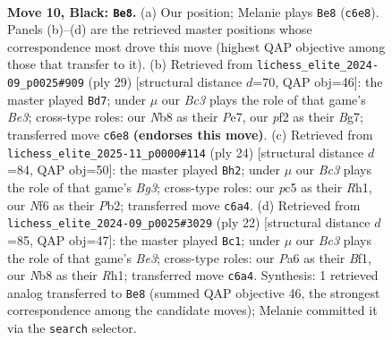 \documentclass[11pt]{article}
\begin{document}
\begin{figure}[p]\centering
\begin{subfigure}{0.46\textwidth}\centering
\resizebox{\linewidth}{!}{%
\newchessgame
\chessboard[
  setfen={rn1k1b1r/1p3ppp/p1b1pn2/2P1N3/P1B5/4P3/1P3PPP/RNB2RK1 b - - 1 10},
  showmover=false,
  pgfstyle=straightmove, color=movearrow, markmove={c6-e8}
]}
\caption{}
\end{subfigure}\hfill
\begin{subfigure}{0.46\textwidth}\centering
\resizebox{\linewidth}{!}{%
\newchessgame
\chessboard[
  setfen={r3k2r/4ppbp/p3b1p1/1pn5/1n1N4/2N1P3/PP3PPP/RBB2RK1 b kq - 1 15},
  showmover=false,
  pgfstyle=straightmove, color=movearrow, markmove={e6-d7}
]}
\caption{}
\end{subfigure}
\\[4pt]
\begin{subfigure}{0.46\textwidth}\centering
\resizebox{\linewidth}{!}{%
\newchessgame
\chessboard[
  setfen={r1b1kb1r/pp3ppp/2pp4/8/2PNn3/4P1BP/PP3PP1/R3KB1R w KQkq - 0 13},
  showmover=false,
  pgfstyle=straightmove, color=movearrow, markmove={g3-h2}
]}
\caption{}
\end{subfigure}\hfill
\begin{subfigure}{0.46\textwidth}\centering
\resizebox{\linewidth}{!}{%
\newchessgame
\chessboard[
  setfen={r1br2k1/ppp2ppp/2n5/8/P3pNn1/2P1B3/1PP2PPP/R3KB1R w - - 5 12},
  showmover=false,
  pgfstyle=straightmove, color=movearrow, markmove={e3-c1}
]}
\caption{}
\end{subfigure}
\caption{\textbf{Move 10, Black: \texttt{Be8}.} (a) Our position; Melanie plays \texttt{Be8} (\texttt{c6e8}). Panels (b)--(d) are the retrieved master positions whose correspondence most drove this move (highest QAP objective among those that transfer to it). (b) Retrieved from \texttt{lichess\_elite\_2024-09\_p0025\#909} (ply 29) [structural distance $d$=70, QAP obj=46]: the master played \texttt{Bd7}; under $\mu$ our \emph{Bc3} plays the role of that game's \emph{Be3}; cross-type roles: our \emph{N}b8 as their \emph{P}e7, our \emph{p}f2 as their \emph{B}g7; transferred move \texttt{c6e8} \textbf{(endorses this move)}. (c) Retrieved from \texttt{lichess\_elite\_2025-11\_p0000\#114} (ply 24) [structural distance $d$=84, QAP obj=50]: the master played \texttt{Bh2}; under $\mu$ our \emph{Bc3} plays the role of that game's \emph{Bg3}; cross-type roles: our \emph{p}c5 as their \emph{R}h1, our \emph{N}f6 as their \emph{P}b2; transferred move \texttt{c6a4}. (d) Retrieved from \texttt{lichess\_elite\_2024-09\_p0025\#3029} (ply 22) [structural distance $d$=85, QAP obj=47]: the master played \texttt{Bc1}; under $\mu$ our \emph{Bc3} plays the role of that game's \emph{Be3}; cross-type roles: our \emph{P}a6 as their \emph{B}f1, our \emph{N}b8 as their \emph{R}h1; transferred move \texttt{c6a4}. Synthesis: 1 retrieved analog transferred to \texttt{Be8} (summed QAP objective 46, the strongest correspondence among the candidate moves); Melanie committed it via the \texttt{search} selector.}
\label{fig:thought-m19}
\end{figure}
\end{document}
